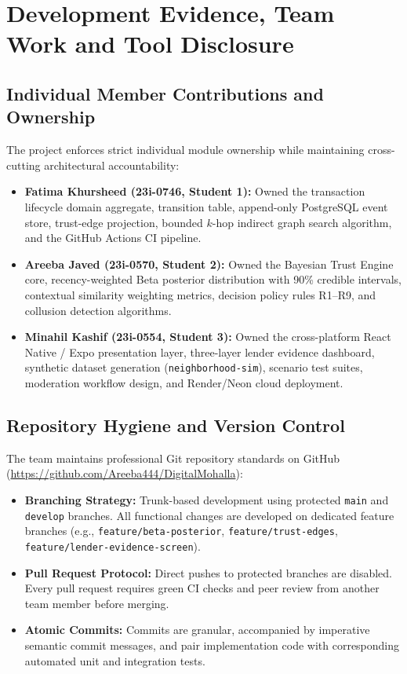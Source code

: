 \chapter{Development Evidence, Team Work and Tool Disclosure}

\section{Individual Member Contributions and Ownership}
The project enforces strict individual module ownership while maintaining cross-cutting architectural accountability:
\begin{itemize}
    \item \textbf{Fatima Khursheed (23i-0746, Student 1):} Owned the transaction lifecycle domain aggregate, transition table, append-only PostgreSQL event store, trust-edge projection, bounded $k$-hop indirect graph search algorithm, and the GitHub Actions CI pipeline.
    \item \textbf{Areeba Javed (23i-0570, Student 2):} Owned the Bayesian Trust Engine core, recency-weighted Beta posterior distribution with 90\% credible intervals, contextual similarity weighting metrics, decision policy rules R1--R9, and collusion detection algorithms.
    \item \textbf{Minahil Kashif (23i-0554, Student 3):} Owned the cross-platform React Native / Expo presentation layer, three-layer lender evidence dashboard, synthetic dataset generation (\texttt{neighborhood-sim}), scenario test suites, moderation workflow design, and Render/Neon cloud deployment.
\end{itemize}

\section{Repository Hygiene and Version Control}
The team maintains professional Git repository standards on GitHub (\url{https://github.com/Areeba444/DigitalMohalla}):
\begin{itemize}
    \item \textbf{Branching Strategy:} Trunk-based development using protected \texttt{main} and \texttt{develop} branches. All functional changes are developed on dedicated feature branches (e.g., \texttt{feature/beta-posterior}, \texttt{feature/trust-edges}, \texttt{feature/lender-evidence-screen}).
    \item \textbf{Pull Request Protocol:} Direct pushes to protected branches are disabled. Every pull request requires green CI checks and peer review from another team member before merging.
    \item \textbf{Atomic Commits:} Commits are granular, accompanied by imperative semantic commit messages, and pair implementation code with corresponding automated unit and integration tests.
\end{itemize}

